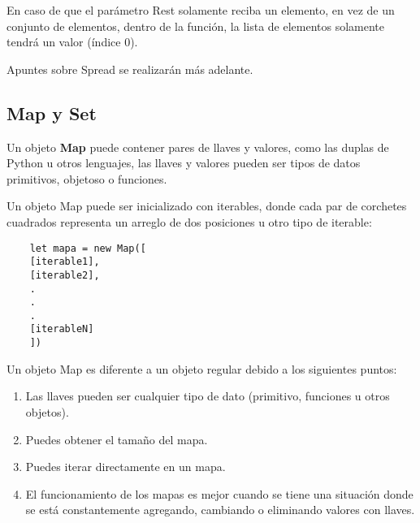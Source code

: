 En caso de que el parámetro Rest solamente reciba un elemento, en vez de un conjunto de elementos, dentro de la función, la lista de elementos solamente tendrá un valor (índice 0).

Apuntes sobre Spread se realizarán más adelante.


\subsection{Map y Set}

Un objeto \textbf{Map} puede contener pares de llaves y valores, como las duplas de Python u otros lenguajes, las llaves y valores pueden ser tipos de datos primitivos, objetoso o funciones.

Un objeto Map puede ser inicializado con iterables, donde cada par de corchetes cuadrados representa un arreglo de dos posiciones u otro tipo de iterable:
\begin{lstlisting}
    let mapa = new Map([
    [iterable1],
    [iterable2],
    .
    .
    .
    [iterableN]
    ])
\end{lstlisting}

Un objeto Map es diferente a un objeto regular debido a los siguientes puntos:
\begin{enumerate}
    \item Las llaves pueden ser cualquier tipo de dato (primitivo, funciones u otros objetos).
    \item Puedes obtener el tamaño del mapa.
    \item Puedes iterar directamente en un mapa.
    \item El funcionamiento de los mapas es mejor cuando se tiene una situación donde se está constantemente agregando, cambiando o eliminando valores con llaves.
\end{enumerate}

